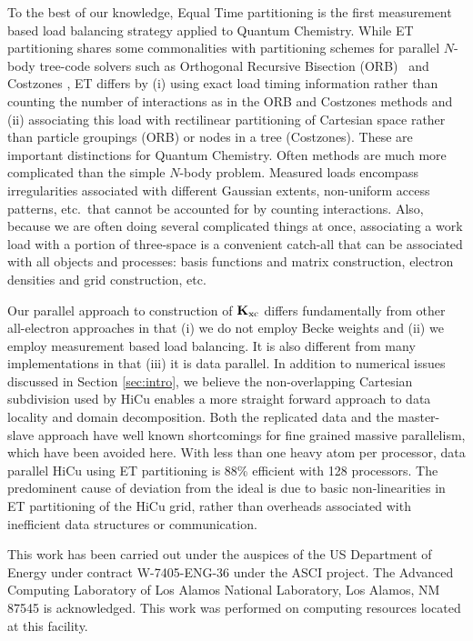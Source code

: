 \commentoutA{\documentclass[prb,aps,twocolumn,twocolumngrid]{revtex4}}
\newcommand{\Kxc}{{\bf K}_{\mathrm{xc}}}
\begin{document}
To the best of our knowledge, Equal Time partitioning is the first measurement based 
load balancing strategy applied to Quantum Chemistry.  While ET partitioning
shares some commonalities with partitioning schemes for parallel $N$-body tree-code solvers
such as Orthogonal Recursive Bisection (ORB)~\cite{warren:92_article} 
and Costzones \cite{Singh93}, ET differs by (i) using exact load timing information rather 
than counting the number of interactions as in the ORB and Costzones methods and (ii) associating
this load with rectilinear partitioning of Cartesian space rather than particle groupings (ORB) 
or nodes in a tree (Costzones).  These are important distinctions for Quantum Chemistry.
Often methods are much more complicated than the simple $N$-body problem.  Measured loads encompass 
irregularities associated with different Gaussian extents, non-uniform access patterns, etc.~that 
cannot be accounted for by counting interactions.  Also, because we are often doing several complicated things 
at once, associating a work load with a portion of three-space is a convenient catch-all
that can be associated with all objects and processes: basis functions and matrix construction,
electron densities and grid construction, etc.  

Our parallel approach to construction of $\Kxc$ differs fundamentally from other all-electron approaches 
in that (i) we do not employ Becke weights and (ii) we employ measurement based load balancing.
It is also different from many implementations in that (iii) it is data parallel. 
In addition to numerical issues discussed in Section \ref{sec:intro}, we believe the non-overlapping
Cartesian subdivision used by HiCu enables a more straight forward approach to data locality 
and domain decomposition.  Both the replicated data and the master-slave approach 
have well known shortcomings for fine grained massive parallelism, which have been avoided
here.  With less than one heavy atom per processor, data parallel HiCu using ET partitioning
is 88\% efficient with 128 processors.  The predominent cause of deviation from the ideal
is due to basic non-linearities in ET partitioning of the HiCu grid, rather than overheads 
associated with inefficient data structures or communication.

\begin{acknowledgments}
This work has been carried out under the auspices of the US Department 
of Energy under contract W-7405-ENG-36 under the ASCI project.
The Advanced Computing Laboratory of Los Alamos 
National Laboratory, Los Alamos, NM 87545 is acknowledged.  This work was 
performed on computing resources located at this facility.
\end{acknowledgments}
\end{document}
